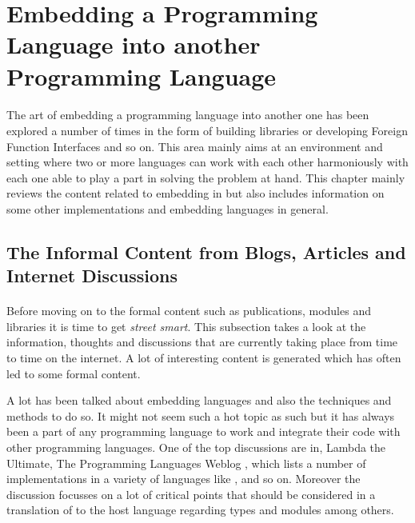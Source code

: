 \documentclass[proposal.tex]{subfiles}
\begin{document}
\section{Embedding a Programming Language into another Programming Language }\label{sect:embedding}

\paragraph{} 
The art of embedding a programming language into another one has been explored a number of times in the form 
of building libraries or developing Foreign Function Interfaces and so on. This area mainly aims at an environment 
and setting where two or more languages can work with each other harmoniously with each one able to play a part 
in solving the problem at hand. This chapter mainly reviews the content related to embedding  in 
 but also includes information on some other implementations and embedding languages in 
general.          

\subsection{The Informal Content from Blogs, Articles and Internet Discussions}

\paragraph{} 
Before moving on to the formal content such as publications, modules and libraries it is time to get \textit{street 
smart}. This subsection takes a look at the information, thoughts and discussions that are currently taking place 
from time to time on the internet. A lot of interesting content is generated which has often led to some formal 
content.   

\par A lot has been talked about embedding languages and also the techniques and methods to do so. It might not 
seem such a hot topic as such but it has always been a part of any programming language to work and integrate 
their code with other programming languages. One of the top discussions are in, Lambda the Ultimate, The 
Programming Languages Weblog \cite{website:lambda-the-ultimate},  which lists a number of  
implementations in a variety of languages like , 
 \cite{racklog} and so on. Moreover the discussion focusses on a lot of critical points that should 
be considered in a translation of  to the host language regarding types and modules among 
others. 
\end{document}
